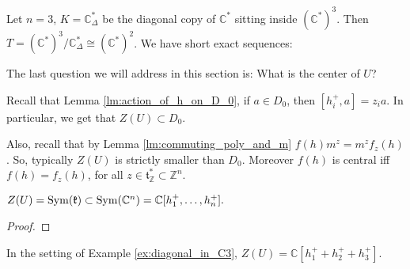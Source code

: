 \begin{example}\label{ex:diagonal_in_C3}
Let $n=3$, $K=\mathbb{C}^*_\Delta$ be the diagonal copy of $\mathbb{C}^*$ sitting inside $(\mathbb{C}^*)^3$. Then $T=(\mathbb{C}^*)^3/\mathbb{C}^*_\Delta\cong (\mathbb{C}^*)^2$. We have short exact sequences:



\end{example}

The last question we will address in this section is: What is the center of $U$?

Recall that Lemma \ref{lm:action_of_h_on_D_0}, if $a\in D_0$, then $[h_i^+,a]=z_ia$. In particular, we get that $Z(U)\subset D_0$.

Also, recall that by Lemma \ref{lm:commuting_poly_and_m} $f(h)m^z=m^zf_z(h)$. So, typically $Z(U)$ is strictly smaller than $D_0$.  Moreover $f(h)$ is central iff $f(h)=f_z(h)$, for all $z\in\mathfrak{t}^*_{\mathbb{Z}}\subset \mathbb{Z}^n$.

\begin{proposition}\label{prop:center_of_HEA}
$Z(U)={\rm Sym }(\mathfrak{k})\subset {\rm Sym }(\mathbb{C}^n)=\mathbb{C}[h_1^+,\dots,h_n^+].$
\end{proposition}
\begin{proof}

\end{proof}

\begin{example}
In the setting of Example \ref{ex:diagonal_in_C3}, $Z(U)=\mathbb{C}[h_1^++h_2^++h_3^+]$.
\end{example}

